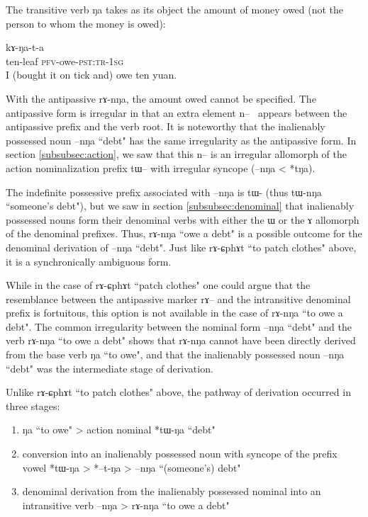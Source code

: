\documentclass[oldfontcommands,oneside,a4paper,11pt]{article}
\newcommand{\ipa}[1]{{\phon \mbox{#1}}} %
\begin{document}
The transitive verb  \ipa{ŋa} takes as its object the amount of money owed (not the person to whom the money is owed):
   \begin{exe} \label{ex:kaNata}
\ex
\gll    \ipa{sqɯ-mpɕar } \ipa{kɤ-ŋa-t-a} \\
 ten-leaf \textsc{pfv}-owe-\textsc{pst:tr-1sg} \\
 \glt  I (bought it on tick and) owe  ten yuan.
\end{exe} 

With the antipassive  \ipa{rɤ-nŋa}, the amount owed cannot be specified. The antipassive form is irregular in that  an extra element \ipa{n-- } appears between the antipassive prefix and the verb root. It is noteworthy that the  inalienably possessed noun \ipa{--nŋa} ``debt"  has the same irregularity as the antipassive form. In section \ref{subsubsec:action}, we saw that this \ipa{n}-- is an irregular allomorph of the action nominalization prefix \ipa{tɯ}-- with irregular syncope (\ipa{--nŋa} < *\ipa{tŋa}).

The indefinite possessive prefix associated with \ipa{--nŋa} is \ipa{tɯ-} (thus \ipa{tɯ-nŋa} ``someone's debt"), but we saw in section \ref{subsubsec:denominal} that inalienably possessed nouns form their denominal verbs with either the \ipa{ɯ} or the \ipa{ɤ} allomorph of the denominal prefixes. Thus, \ipa{rɤ-nŋa} ``owe a debt" is a possible outcome for the denominal derivation of \ipa{--nŋa} ``debt". Just like \ipa{rɤ-ɕphɤt} ``to patch clothes" above, it is a synchronically ambiguous form.

While in the case of \ipa{rɤ-ɕphɤt} ``patch clothes" one could argue that the resemblance between the antipassive marker \ipa{rɤ}-- and the intransitive denominal prefix is fortuitous, this option is not available in the case of \ipa{rɤ-nŋa} ``to owe a debt".  The common irregularity between the nominal form \ipa{--nŋa} ``debt" and the verb \ipa{rɤ-nŋa} ``to owe a debt" shows that \ipa{rɤ-nŋa} cannot have been  directly derived from the base verb \ipa{ŋa} ``to owe", and that the inalienably possessed noun   \ipa{--nŋa} ``debt" was the intermediate stage of derivation.  
 
 Unlike \ipa{rɤ-ɕphɤt} ``to patch clothes" above, the pathway of derivation occurred in three stages:
 
 \begin{enumerate}
\item \ipa{ŋa} ``to owe"  > action nominal *\ipa{tɯ-ŋa} ``debt"
\item conversion into an inalienably possessed noun with syncope of the prefix vowel *\ipa{tɯ-ŋa} > *\ipa{--t-ŋa} > \ipa{--nŋa} ``(someone's) debt"
\item denominal derivation from the inalienably possessed nominal into an intransitive verb \ipa{--nŋa} > \ipa{rɤ-nŋa} ``to owe a debt"
\end{enumerate}
\end{document}
